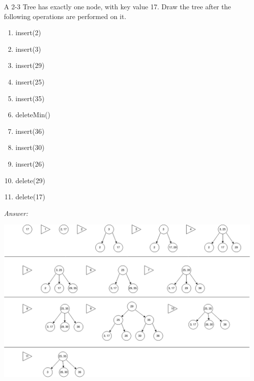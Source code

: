 \documentclass[a4paper]{article}
\newcommand{\ans}{\textit{Answer: }}
\newenvironment{question}[2][Question]{\begin{trivlist}
\item[\hskip \labelsep {\bfseries #1}\hskip \labelsep {\bfseries #2.}]}{\end{trivlist}}
\begin{document}
\begin{question}{14}
A 2-3 Tree has exactly one node, with key value 17. Draw the tree after the following
operations are performed on it.

\begin{enumerate}
  \item insert(2)
  \item insert(3)
  \item insert(29)
  \item insert(25)
  \item insert(35)
  \item deleteMin()
  \item insert(36)
  \item insert(30)
  \item insert(26)
  \item delete(29)
  \item delete(17)
\end{enumerate}
\ans
\begin{center}
  \includegraphics[width=\textwidth]{fig7.png}
\end{center}

\end{question}
\end{document}
